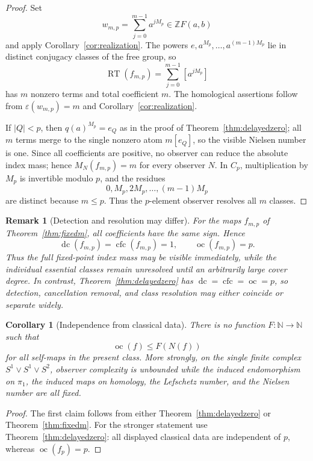 \documentclass[11pt]{article}
\newtheorem{corollary}[theorem]{Corollary}
\newtheorem{remark}[theorem]{Remark}
\DeclareMathOperator{\oc}{oc}
\DeclareMathOperator{\dc}{dc}
\DeclareMathOperator{\cfc}{cfc}
\newcommand{\RT}{\operatorname{RT}}
\newcommand{\Z}{\mathbb Z}
\newcommand{\N}{\mathbb N}
\begin{document}
\begin{proof}
Set
\[
  w_{m,p}=\sum_{j=0}^{m-1}a^{jM_p}\in\Z F(a,b)
\]
and apply Corollary~\ref{cor:realization}.  The powers
$e,a^{M_p},\dots,a^{(m-1)M_p}$ lie in distinct conjugacy classes of the free
group, so
\[
  \RT(f_{m,p})
  =\sum_{j=0}^{m-1}[a^{jM_p}]
\]
has $m$ nonzero terms and total coefficient $m$.  The homological assertions
follow from $\varepsilon(w_{m,p})=m$ and Corollary~\ref{cor:realization}.

If $|Q|<p$, then $q(a)^{M_p}=e_Q$ as in the proof of
Theorem~\ref{thm:delayedzero}; all $m$ terms merge to the single nonzero atom
$m[e_Q]$, so the visible Nielsen number is one.  Since all coefficients are
positive, no observer can reduce the absolute index mass; hence
$M_N(f_{m,p})=m$ for every observer $N$.  In $C_p$, multiplication by
$M_p$ is invertible modulo $p$, and the residues
\[
  0,M_p,2M_p,\dots,(m-1)M_p
\]
are distinct because $m\le p$.  Thus the $p$-element observer resolves all
$m$ classes.
\end{proof}

\begin{remark}[Detection and resolution may differ]
For the maps $f_{m,p}$ of Theorem~\ref{thm:fixedm}, all coefficients have
the same sign.  Hence
\[
  \dc(f_{m,p})=\cfc(f_{m,p})=1,
  \qquad
  \oc(f_{m,p})=p.
\]
Thus the full fixed-point index mass may be visible immediately, while the
individual essential classes remain unresolved until an arbitrarily large
cover degree.  In contrast, Theorem~\ref{thm:delayedzero} has
$\dc=\cfc=\oc=p$, so detection, cancellation removal, and class resolution
may either coincide or separate widely.
\end{remark}

\begin{corollary}[Independence from classical data]
\label{cor:independence}
There is no function $F\colon\N\to\N$ such that
\[
  \oc(f)\le F(N(f))
\]
for all self-maps in the present class.  More strongly, on the single finite
complex $S^1\vee S^1\vee S^2$, observer complexity is unbounded while the
induced endomorphism on $\pi_1$, the induced maps on homology, the Lefschetz
number, and the Nielsen number are all fixed.
\end{corollary}

\begin{proof}
The first claim follows from either Theorem~\ref{thm:delayedzero} or
Theorem~\ref{thm:fixedm}.  For the stronger statement use
Theorem~\ref{thm:delayedzero}: all displayed classical data are independent of
$p$, whereas $\oc(f_p)=p$.
\end{proof}
\end{document}
